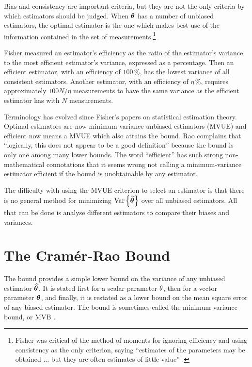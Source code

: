 Bias and consistency are important criteria, but they are not the only 
criteria by which estimators should be judged.  When $\bm{\theta}$ has a number of
unbiased estimators, the optimal estimator is the one which makes best use
of the information contained in the set of measurements.\footnote{Fisher was
critical of the method of moments for ignoring efficiency and using
consistency as the only criterion, saying ``estimates of the parameters may
be obtained $\ldots$ but they are often estimates of little value''
\protect\cite{Fis25}.}

Fisher measured an estimator's efficiency as the ratio of the estimator's
variance to the most efficient estimator's variance, expressed as a
percentage.  Then an efficient estimator, with an efficiency of $100\,\%$,
has the lowest variance of all consistent estimators.  Another estimator,
with an efficiency of $\eta\,\%$, requires approximately $100 N/\eta$
measurements to have the same variance as the efficient estimator has with $N$
measurements.

Terminology has evolved since Fisher's papers on statistical estimation
theory.  Optimal estimators are now minimum variance unbiased
estimators (MVUE) and efficient now means a MVUE which also
attains the \CR bound.  Rao \cite[p. 283]{Rao65} complains that ``logically,
this does not appear to be a good definition'' because the \CR bound is only 
one among many lower bounds.  The word ``efficient'' has such strong
non-mathematical connotations that it seems wrong not calling a
minimum-variance estimator efficient if the \CR bound is unobtainable by any
estimator.

The difficulty with using the MVUE criterion to select an estimator is that
there is no general method for minimizing ${\mathop{\rm Var}\nolimits\left\{\widehat{\bm{\theta}}\right\}}$ over all unbiased
estimators.  All that can be done is analyse different estimators to compare
their biases and variances.

\section{The Cram\'{e}r-Rao Bound}

The \CR bound provides a simple lower bound on the variance of any unbiased
estimator $\widehat{\bm{\theta}}$.  It is stated first for a scalar parameter $\theta$, then 
for a vector parameter $\bm{\theta}$, and finally, it is restated as a lower bound
on the mean square error of any biased estimator.  The \CR bound is
sometimes called the minimum variance bound, or MVB \cite{Stu91}.


